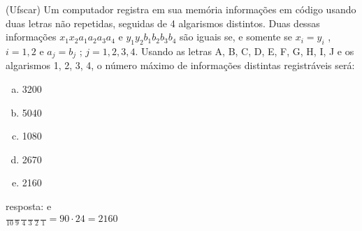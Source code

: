 \begin{ex}
 (Ufscar) Um computador registra em sua memória informações em código usando duas letras não repetidas, seguidas de 4 algarismos distintos. Duas dessas informações $x_1 x_2 a_1 a_2 a_3 a_4$ e $y_1 y_2 b_1 b_2 b_3 b_4$  são iguais se, e somente se $ x_i=y_i $ , $ i=1,2 $ e $ a_j=b_j $ ; $ j=1,2,3,4 $. Usando as letras A, B, C, D, E, F, G, H, I, J e os algarismos 1, 2, 3, 4, o número máximo de informações distintas registráveis será:
    \begin{enumerate}[(a)]
    \item 3200
    \item 5040
    \item 1080
    \item 2670
    \item 2160
    \end{enumerate}
      \begin{sol}
        resposta: e \\
        $\frac{\phantom{A}}{10}\frac{\phantom{A}}{9}\frac{\phantom{A}}{4}\frac{\phantom{A}}{3}\frac{\phantom{A}}{2}\frac{\phantom{A}}{1}= 90\cdot24=2160$
      \end{sol}
\end{ex}